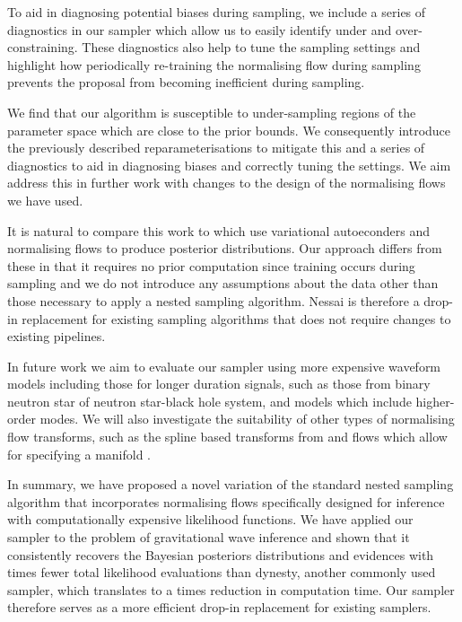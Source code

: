 \documentclass[%
 reprint,
nofootinbib,
 amsmath,amssymb,
 aps,
 prd,
]{revtex4-2}
\newcommand{\nessai}{{\sc Nessai}\xspace}
\newcommand{\dynesty}{{\sc dynesty}\xspace}
\begin{document}
To aid in diagnosing potential biases during sampling, we include a series of diagnostics in our sampler which allow us to easily identify under and over-constraining. These diagnostics also help to tune the sampling settings and highlight how periodically re-training the normalising flow during sampling prevents the proposal from becoming inefficient during sampling.

We find that our algorithm is susceptible to under-sampling regions of the parameter space which are close to the prior bounds. We consequently introduce the previously described reparameterisations to mitigate this and a series of diagnostics to aid in diagnosing biases and correctly tuning the settings. We aim address this in further work with changes to the design of the normalising flows we have used.

It is natural to compare this work to \cite{Gabbard:2019,Chua:2019,Green:2020a,Green:2020complete} which use variational autoeconders and normalising flows to produce posterior distributions. Our approach differs from these in that it requires no prior computation since training occurs during sampling and we do not introduce any assumptions about the data other than those necessary to apply a nested sampling algorithm. \nessai is therefore a drop-in replacement for existing sampling algorithms that does not require changes to existing pipelines.

In future work we aim to evaluate our sampler using more expensive waveform models including those for longer duration signals, such as those from binary neutron star of neutron star-black hole system, and models which include higher-order modes. We will also investigate the suitability of other types of normalising flow transforms, such as the spline based transforms from \cite{Durkan:2019nsf} and flows which allow for specifying a manifold \cite{Brehemer:2020manifold}.

In summary, we have proposed a novel variation of the standard nested sampling algorithm that incorporates normalising flows specifically designed for inference with computationally expensive likelihood functions. We have applied our sampler to the problem of gravitational wave inference and shown that it consistently recovers the Bayesian posteriors distributions and evidences with \evaluationsratio times fewer total likelihood evaluations than \dynesty, another commonly used sampler, which translates to a \timeratio times reduction in computation time. Our sampler therefore serves as a more efficient drop-in replacement for existing samplers.
\end{document}
